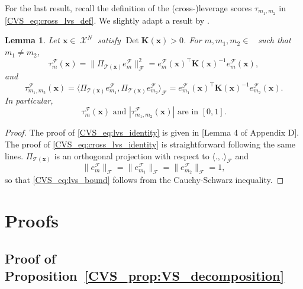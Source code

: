 \documentclass[twoside,11pt]{book}
\newtheorem{lemma}{Lemma}
\numberwithin{theorem}{chapter}
\numberwithin{definition}{chapter}
\numberwithin{proposition}{chapter}
\numberwithin{corollary}{chapter}
\numberwithin{example}{chapter}
\numberwithin{lemma}{chapter}
\numberwithin{assumption}{chapter}
\DeclareMathOperator{\Det}{Det}
\DeclareMathOperator{\Tran}{\intercal}
\DeclareMathOperator{\F}{\mathcal{F}}
\DeclareMathOperator{\X}{\mathcal{X}}
\DeclareMathOperator{\Ns}{\mathbb{N}^{*}}
\newcommand{\rb}[1]{\textcolor{magenta}{#1}}
\begin{document}
For the last result, recall the definition of the (cross-)leverage scores $\tau_{m_{1},m_{2}}$ in \eqref{CVS_eq:cross_lvs_def}. We slightly adapt a result by \cite{BeBaCh19} .
\begin{lemma}\label{CVS_lemma:lvs_identities}
Let $\bm{x} \in \X^{N}$ satisfy $\Det \bm{K}(\bm{x}) > 0$. For $m, m_{1}, m_{2} \in \Ns$ such that $m_{1} \neq m_{2}$,
\begin{equation}\label{CVS_eq:lvs_identity}
\tau_{m}^{\F}(\bm{x}) = \|\Pi_{\mathcal{T}(\bm{x})}e_{m}^{\F}\|_{\F}^{2} = e_{m}^{\F}(\bm{x})^{\Tran} \bm{K}(\bm{x})^{-1} e_{m}^{\F}(\bm{x}),
\end{equation}
and
\begin{equation}\label{CVS_eq:cross_lvs_identity}
\tau_{m_{1},m_{2}}^{\F}(\bm{x}) = \langle \Pi_{\mathcal{T}(\bm{x})}e_{m_{1}}^{\F}, \Pi_{\mathcal{T}(\bm{x})}e_{m_{2}}^{\F} \rangle_{\F} = e_{m_1}^{\F}(\bm{x})^{\Tran} \bm{K}(\bm{x})^{-1} e_{m_2}^{\F}(\bm{x}).
\end{equation}
In particular,
\begin{equation}
  \label{CVS_eq:lvs_bound}
  \tau_{m}^{\F}(\bm{x})\text{  and  }|\tau_{m_{1},m_{2}}^{\F}(\bm{x})|\text{  are in  }[0,1].
\end{equation}
\end{lemma}
\begin{proof}
The proof of \eqref{CVS_eq:lvs_identity} is given in \citep{BeBaCh19}[Lemma 4 of Appendix D]. The proof of \eqref{CVS_eq:cross_lvs_identity} is straightforward following the same lines. $\Pi_{\mathcal{T}(\bm{x})}$ is an orthogonal projection with respect to $\langle .,. \rangle_{\F}$ and
\begin{equation}
\|e_{m}^{\F}\|_{\F} = \|e_{m_{1}}^{\F}\|_{\F} = \|e_{m_{2}}^{\F}\|_{\F} = 1,
\end{equation}
so that \eqref{CVS_eq:lvs_bound} follows from the Cauchy-Schwarz inequality.
\end{proof}

\section{Proofs}
 \subsection{Proof of Proposition~\ref{CVS_prop:VS_decomposition}}\label{CVS_sec:proof_VS_decomposition}
\end{document}
